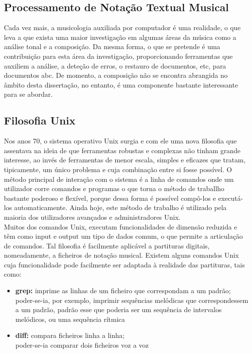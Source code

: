 \documentclass[runningheads,a4paper]{llncs}
\begin{document}
\subsection{Processamento de Notação Textual Musical}
Cada vez mais, a musicologia auxiliada por computador é uma realidade, o que leva a que exista uma
maior investigação em algumas áreas da música como a análise tonal e a composição. Da mesma forma, o
que se pretende é uma contribuição para esta área da investigação, proporcionando ferramentas que
auxiliem a análise, a deteção de erros, o restauro de documentos, etc, para documentos abc. De
momento, a composição não se encontra abrangida no âmbito desta dissertação, no entanto, é uma
componente bastante interessante para se abordar.

\subsection{Filosofia Unix}
Nos anos 70, o sistema operativo Unix surgia e com ele uma nova filosofia que assentava na ideia de
que ferramentas robustas e complexas não tinham grande interesse, ao invés de ferramentas de menor
escala, simples e eficazes que tratam, tipicamente, um único problema e cuja combinação entre si
fosse possível. O método principal de interação com o sistema é a linha de comandos onde um
utilizador corre comandos e programas o que torna o método de traballho bastante poderoso e
flexível, porque dessa forma é possível compô-los e executá-los automaticamente. Ainda hoje, este
método de trabalho é utilizado pela maioria dos utilizadores avançados e administradores Unix.\\

Muitos dos comandos Unix, executam funcionalidades de dimensão reduzida e têm como input e output um
tipo de dados comum, o que permite a articulação de comandos. Tal filosofia é facilmente aplicável a
partituras digitais, nomeadamente, a ficheiros de notação musical. Existem alguns comandos Unix cuja
funcionalidade pode facilmente ser adaptada à realidade das partituras, tais como:
\begin{itemize}
  \item \textbf{grep:} imprime as linhas de um ficheiro que correspondam a um padrão;\\
poder-se-ia, por exemplo, imprimir sequências melódicas que correspondessem a um padrão, padrão esse
que poderia ser um sequência de intervalos melódicos, ou uma sequência rítmica
\item \textbf{diff:} compara ficheiros linha a linha;\\
poder-se-ia comparar dois ficheiros voz a voz
\end{itemize}
\end{document}
